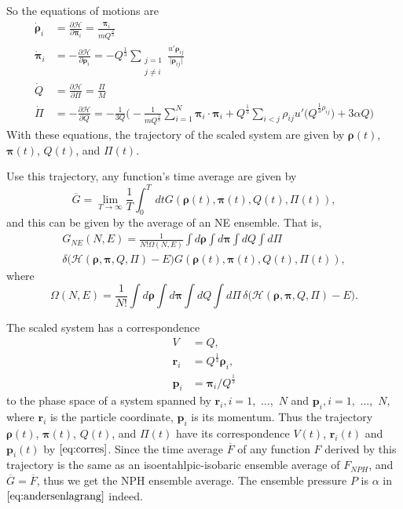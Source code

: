 So the equations of motions are
\begin{align}
	\dot{ \bm{\rho} }_i & = \frac{ \partial \mathcal{H} }{ \partial \bm{\pi}_i } =
	\frac{ \bm{\pi}_i }{ m Q^{\frac{ 2 }{ 3 }} }\\
	\dot{ \bm{\pi} }_i  & = - \frac{ \partial \mathcal{H} }{ \partial \bm{\rho}_i } =
	- Q^{\frac{ 1 }{ 3 }} \sum_{\substack{j=1\\j\neq i}}
	\frac{ u' \bm{\rho}_{ij} }{ \lvert \bm{\rho}_{ij} \rvert  }\\
	\dot{ Q }           & = \frac{ \partial \mathcal{H} }{ \partial \Pi } =
	\frac{ \Pi }{ M } \\
	\dot{ \Pi }         & = - \frac{ \partial \mathcal{H} }{ \partial Q } =
	- \frac{ 1 }{ 3Q } \bigg(
	- \frac{ 1 }{ m Q^{\frac{ 2 }{ 3 }} }	\sum_{i=1}^{N} \bm{\pi}_i \cdot \bm{\pi}_i
	+ Q^{\frac{ 1 }{ 3 }} \sum_{i<j} \rho_{ij} u'\big(Q^{\frac{ 1 }{ 3 } \rho_{ij}}\big) +
	3 \alpha Q
	\bigg)
\end{align}
With these equations, the trajectory of the scaled system are given by
$\bm{\rho}(t)$, $\bm{\pi}(t)$, $Q(t)$, and $\Pi(t)$.

Use this trajectory, any function's time average are given by
\begin{equation}
	\overline{G} = \lim_{T \rightarrow \infty} \frac{ 1 }{ T } \int_{0}^{T}  \, dt
	G(\bm{\rho}(t), \bm{\pi}(t), Q(t), \Pi(t)),
\end{equation}
and this can be given by the average of an NE ensemble. That is,
\begin{multline}
	G_{NE} (N, E) = \frac{ 1 }{ N! \Omega(N,E) } \int d\bm{\rho} \int d\bm{\pi}
	\int dQ \int d\Pi \\
	\delta \big( \mathcal{H}(\bm{\rho}, \bm{\pi}, Q, \Pi)
	- E \big) G(\bm{\rho}(t), \bm{\pi}(t), Q(t), \Pi(t)),
\end{multline}
where
\begin{equation}
	\Omega(N, E) = \frac{ 1 }{ N! }  \int d\bm{\rho} \int d\bm{\pi}
	\int dQ \int d\Pi \, \delta \big( \mathcal{H}(\bm{\rho}, \bm{\pi}, Q, \Pi)
	- E \big).
\end{equation}

The scaled system has a correspondence
\begin{align}\label{eq:corres}
	V        & = Q,                               \\
	\bm{r}_i & = Q^{\frac{ 1 }{ 3 }} \bm{\rho}_i, \\
	\bm{p}_i & = \bm{\pi}_i / Q^{\frac{ 1 }{ 3 }}
\end{align}
to the phase space of a system spanned by
$\bm{r}_i, i=1$,~$\ldots$,~$N$ and
$\bm{p}_i, i=1$,~$\ldots$,~$N$,
where $\bm{r}_i$ is the particle coordinate, $\bm{p}_i$ is its momentum.
Thus the trajectory
$\bm{\rho}(t)$, $\bm{\pi}(t)$, $Q(t)$, and $\Pi(t)$ have its
correspondence $V(t)$, $\bm{r}_i(t)$ and $\bm{p}_i(t)$ by
$\eqref{eq:corres}$.
Since the time average $\overline{F}$ of any function $F$
derived by this trajectory is the same as an
isoentahlpic-isobaric ensemble average of $F_{NPH}$, and
$\overline{G} = \overline{F}$, thus we get the NPH ensemble average.
The ensemble pressure $P$ is $\alpha$ in $\eqref{eq:andersenlagrang}$ indeed.


